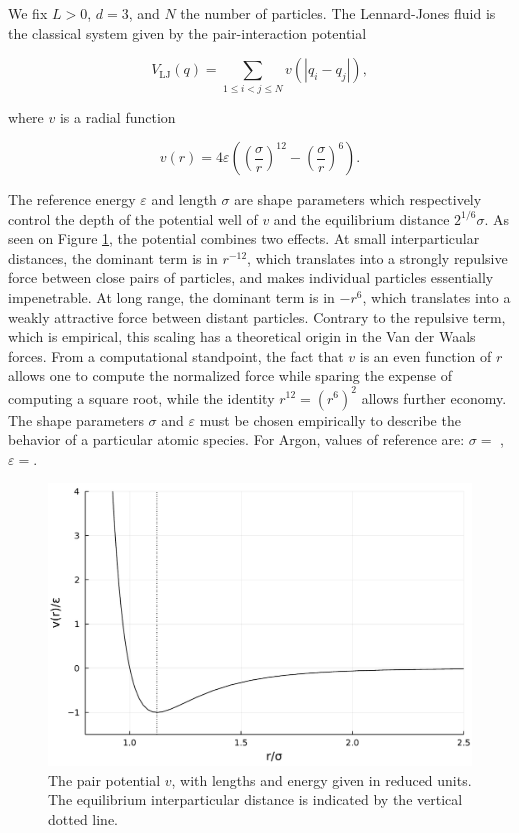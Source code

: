  \begin{example}
    We fix $L>0$, $d=3$, and $N$ the number of particles. The Lennard-Jones fluid is the classical system given by the pair-interaction potential

    \begin{equation}
        \label{eq:lennard_jones}
        V_{\mathrm{LJ}}(q)=\sum_{1\leq i < j \leq N} v(|q_i-q_j|),        
    \end{equation}

    where $v$ is a radial function

    $$v(r)=4\varepsilon \left( \left( \frac{\sigma}{r}\right)^{12}-\left(\frac{\sigma}{r} \right)^6\right).$$

    The reference energy $\varepsilon$ and length $\sigma$ are shape parameters which respectively control the depth of the potential well of $v$ and the equilibrium distance $2^{1/6}\sigma$.
    As seen on Figure \ref{fig:lennard_jones}, the potential combines two effects. At small interparticular distances, the dominant term is in $r^{-12}$, which translates into a strongly repulsive force between close pairs of particles, and makes individual particles essentially impenetrable.
    At long range, the dominant term is in $-r^6$, which translates into a weakly attractive force between distant particles. Contrary to the repulsive term, which is empirical, this scaling has a theoretical origin in the Van der Waals forces.
    From a computational standpoint, the fact that $v$ is an even function of $r$ allows one to compute the normalized force while sparing the expense of computing a square root, while the identity $r^{12}=(r^6)^2$ allows further economy.
    The shape parameters $\sigma$ and $\varepsilon$ must be chosen empirically to describe the behavior of a particular atomic species. For Argon, values of reference are: $\sigma=$ , $\varepsilon=$.
 \end{example}

 \begin{figure}[htbp]
    \begin{center}
      \includegraphics[width=0.7\linewidth]{figures/chapter1/lennard_jones.pdf}
      \caption{ \label{fig:lennard_jones}
        The pair potential $v$, with lengths and energy given in reduced units. The equilibrium interparticular distance is indicated by the vertical dotted line.
      }
    \end{center}
  \end{figure}

